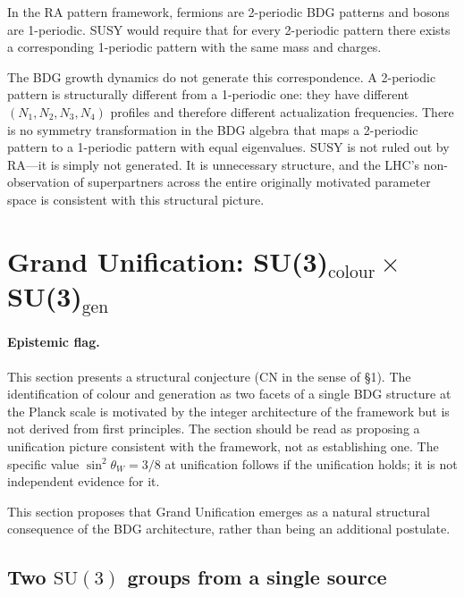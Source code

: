 \documentclass[11pt]{article}
\begin{document}
In the RA pattern framework, fermions are 2-periodic BDG patterns and bosons are 1-periodic. SUSY would require that for every 2-periodic pattern there exists a corresponding 1-periodic pattern with the same mass and charges.

The BDG growth dynamics do not generate this correspondence. A 2-periodic pattern is structurally different from a 1-periodic one: they have different $(N_1,N_2,N_3,N_4)$ profiles and therefore different actualization frequencies. There is no symmetry transformation in the BDG algebra that maps a 2-periodic pattern to a 1-periodic pattern with equal eigenvalues. SUSY is not ruled out by RA---it is simply not generated. It is unnecessary structure, and the LHC's non-observation of superpartners across the entire originally motivated parameter space is consistent with this structural picture.

\section{Grand Unification: SU(3)$_{\mathrm{colour}}\times$SU(3)$_{\mathrm{gen}}$}
\label{sec:gut}

\paragraph{Epistemic flag.} This section presents a structural conjecture (CN in the sense of \S1). The identification of colour and generation as two facets of a single BDG structure at the Planck scale is motivated by the integer architecture of the framework but is not derived from first principles. The section should be read as proposing a unification picture consistent with the framework, not as establishing one. The specific value $\sin^2\theta_W=3/8$ at unification follows if the unification holds; it is not independent evidence for it.

This section proposes that Grand Unification emerges as a natural structural consequence of the BDG architecture, rather than being an additional postulate.

\subsection{Two $\mathrm{SU}(3)$ groups from a single source}
\end{document}
